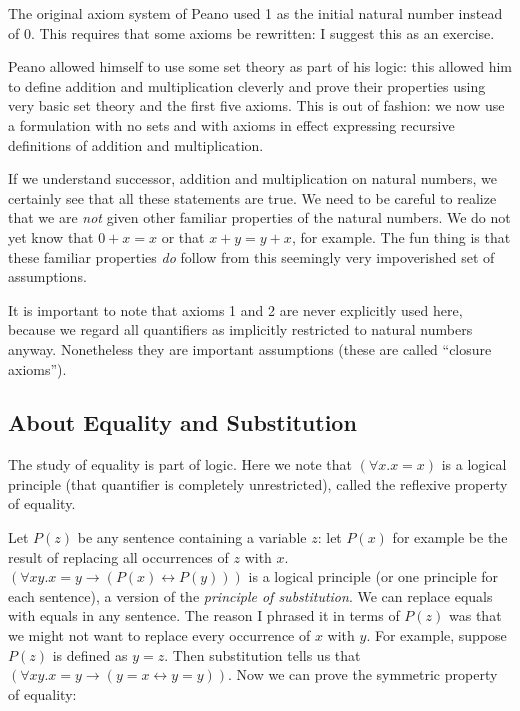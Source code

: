 \documentclass[12pt]{article}
\begin{document}
The original axiom system of Peano used 1 as the initial natural
number instead of 0.  This requires that some axioms be rewritten: I
suggest this as an exercise.

Peano allowed himself to use some set theory as part of his logic:
this allowed him to define addition and multiplication cleverly and
prove their properties using very basic set theory and the first five
axioms.  This is out of fashion: we now use a formulation with no sets
and with axioms in effect expressing recursive definitions of addition
and multiplication.

If we understand successor, addition and multiplication on natural
numbers, we certainly see that all these statements are true.  We need
to be careful to realize that we are {\em not\/} given other familiar
properties of the natural numbers.  We do not yet know that $0+x=x$ or
that $x+y=y+x$, for example.  The fun thing is that these familiar
properties {\em do\/} follow from this seemingly very impoverished set
of assumptions.

It is important to note that axioms 1 and 2 are never explicitly used
here, because we regard all quantifiers as implicitly restricted to
natural numbers anyway.  Nonetheless they are important assumptions
(these are called ``closure axioms'').

\subsection{About Equality and Substitution}

The study of equality is part of logic.  Here we note that $(\forall
x.x=x)$ is a logical principle (that quantifier is completely
unrestricted), called the reflexive property of equality.

Let $P(z)$ be any sentence containing a variable $z$: let $P(x)$ for
example be the result of replacing all occurrences of $z$ with $x$.
$(\forall xy.x=y \rightarrow (P(x) \leftrightarrow P(y)))$ is a logical
principle (or one principle for each sentence), a version of the {\em
principle of substitution\/}.  We can replace equals with equals in
any sentence.  The reason I phrased it in terms of $P(z)$ was that we might not want to replace every occurrence of $x$ with $y$.  For example, suppose
$P(z)$ is defined as $y=z$.  Then substitution tells us that $(\forall xy.x=y \rightarrow (y=x \leftrightarrow y=y))$.  Now we can prove the symmetric property of equality:
\end{document}
